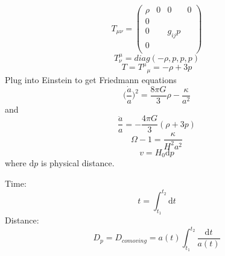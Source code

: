 \documentclass[10pt,landscape,a4paper]{article}
\newcommand{\intgr} {\mathrm{d}}
\newcommand{\munu} {\mu\nu}
\begin{document}
\begin{multicols}{3}
\begin{equation}
T_{\munu} = \begin{pmatrix}
\rho &0&0&0\\
0&&&\\
0&&g_{ij}p&\\
0&&&\\
\end{pmatrix}
\end{equation}
\begin{equation}
T^\mu_\nu =diag(-\rho,p,p,p)
\end{equation}
\begin{equation}
T = T^\mu{}_\mu = -\rho +3p
\end{equation}
Plug into Einstein to get Friedmann equations
\begin{equation}
\bigg(\frac{\dot{a}}{a}\bigg)^2 = \frac{8\pi G}{3}\rho - \frac{\kappa}{a^2}
\end{equation}
and 
\begin{equation}
\frac{\ddot{a}}{a} = -\frac{4\pi G}{3}(\rho+3p)
\end{equation}
\begin{equation}
\Omega -1 =\frac{\kappa}{H^2a^2}
\end{equation}
\begin{equation}
v=H_0\intgr p
\end{equation}
where $\intgr p$ is physical distance.

Time:
\begin{equation}
t = \int_{t_1}^{t_2} \intgr t
\end{equation}
Distance:
\begin{equation}
D_p = D_{comoving} = a(t)\int_{t_1}^{t_2}\frac{\intgr t}{a(t)}
\end{equation}
\end{multicols}
\end{document}
